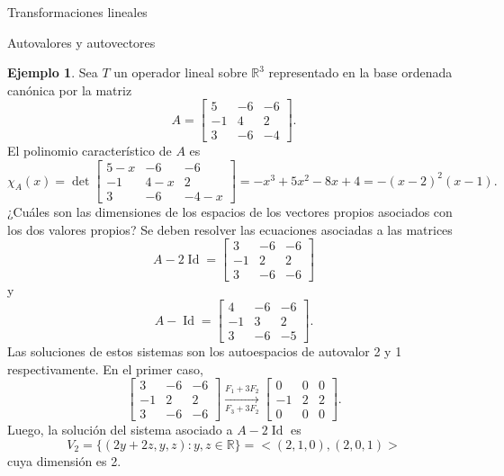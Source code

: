 \documentclass[a4paper,12pt,twoside,spanish,reqno]{amsbook}
\theoremstyle{definition}
\newtheorem{ejemplo}{Ejemplo}[section]
\theoremstyle{remark}
\newcommand{\Id}{\operatorname{Id}}
\newcommand{\R}{\mathbb R}
\begin{document}
\begin{chapter}{Transformaciones lineales}
\begin{section}{Autovalores y autovectores}
		\begin{ejemplo}
			Sea $T$ un operador lineal sobre $\R^3$  representado en la base ordenada canónica por la matriz
			\begin{equation*}
				A = 
				\begin{bmatrix}
				5 &-6 &-6\\ -1& 4& 2\\3 &-6& -4
				\end{bmatrix}.
			\end{equation*}
			El  polinomio característico de $A$ es
			\begin{equation*}
				\chi_A(x) = \det \begin{bmatrix}
					5-x &-6 &-6\\ -1& 4-x& 2\\3 &-6& -4-x
				\end{bmatrix} 
				= -x^3 + 5 x^2 - 8 x + 4 = -(x-2)^2(x-1).
			\end{equation*}
			¿Cuáles son las dimensiones de los espacios de los vectores propios asociados
			con los dos valores propios? Se deben resolver las ecuaciones asociadas a las matrices
			\begin{equation*}
			A - 2 \Id = 
			\begin{bmatrix}
			3 &-6 &-6\\ -1& 2& 2\\3 &-6& -6
			\end{bmatrix} 
			\end{equation*}
			y 
			\begin{equation*}
			A -\Id= 
			\begin{bmatrix}
			4 &-6 &-6\\ -1& 3& 2\\3 &-6& -5
			\end{bmatrix}.
			\end{equation*}
			Las soluciones de estos sistemas son los autoespacios de autovalor 2 y 1 respectivamente. En  el primer caso, 
			\begin{equation*}
			\begin{bmatrix} 3 &-6 &-6\\ -1& 2& 2\\3 &-6& -6 \end{bmatrix}
			\underset{F_3+3F_2}{\stackrel{F_1+3 F_2}{\longrightarrow}} 
			\begin{bmatrix} 0 &0 &0\\ -1& 2& 2\\0 &0& 0 \end{bmatrix}.
			\end{equation*}
			Luego,  la solución del sistema asociado a $A-2\Id$ es 
			$$
			V_2 = \{(2y+2z,y,z): y,z \in \R\} = <(2,1,0),(2,0,1)>
			$$
			cuya dimensión es 2. 
			

\end{ejemplo}
\end{section}
\end{chapter}
\end{document}
